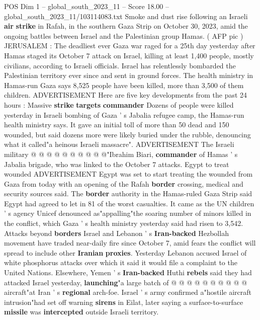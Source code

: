 \begin{textsample}{POS Dim 1 – global\_south\_2023\_11 – Score 18.00 – global\_south\_2023\_11/103114083.txt}  \label{ex:f1_pos_228}
Smoke and dust rise following an Israeli \textbf{air} \textbf{strike} in Rafah, in the southern Gaza Strip on October 30, 2023, amid the ongoing battles between Israel and the Palestinian group Hamas. ( AFP pic ) JERUSALEM : The deadliest ever Gaza war raged for a 25th day yesterday after Hamas staged its October 7 attack on Israel, killing at least 1,400 people, mostly civilians, according to Israeli officials.
Israel has relentlessly bombarded the Palestinian territory ever since and sent in ground forces.
The health ministry in Hamas-run Gaza says 8,525 people have been killed, more than 3,500 of them children.
ADVERTISEMENT Here are five key developments from the past 24 hours : Massive \textbf{strike} \textbf{targets} \textbf{commander} Dozens of people were killed yesterday in Israeli bombing of Gaza ' s Jabalia refugee camp, the Hamas-run health ministry says.
It gave an initial toll of more than 50 dead and 150 wounded, but said dozens more were likely buried under the rubble, denouncing what it called"a heinous Israeli massacre".
ADVERTISEMENT The Israeli military @ @ @ @ @ @ @ @ @ @"Ibrahim Biari, \textbf{commander} of Hamas ' s Jabalia brigade, who was linked to the October 7 attacks.
Egypt to treat wounded ADVERTISEMENT Egypt was set to start treating the wounded from Gaza from today with an opening of the Rafah \textbf{border} crossing, medical and security sources said.
The \textbf{border} authority in the Hamas-ruled Gaza Strip said Egypt had agreed to let in 81 of the worst casualties.
It came as the UN children ' s agency Unicef denounced as"appalling"the soaring number of minors killed in the conflict, which Gaza ' s health ministry yesterday said had risen to 3,542.
Attacks beyond \textbf{borders} Israel and Lebanon ' s \textbf{Iran-backed} Hezbollah movement have traded near-daily fire since October 7, amid fears the conflict will spread to include other \textbf{Iranian} \textbf{proxies}.
Yesterday Lebanon accused Israel of white phosphorus attacks over which it said it would file a complaint to the United Nations.
Elsewhere, Yemen ' s \textbf{Iran-backed} Huthi \textbf{rebels} said they had attacked Israel yesterday, \textbf{launching}"a large batch of @ @ @ @ @ @ @ @ @ @ aircraft"at Iran ' s \textbf{regional} arch-foe.
Israel ' s army confirmed a"hostile aircraft intrusion"had set off warning \textbf{sirens} in Eilat, later saying a surface-to-surface \textbf{missile} was \textbf{intercepted} outside Israeli territory.

\end{textsample}
